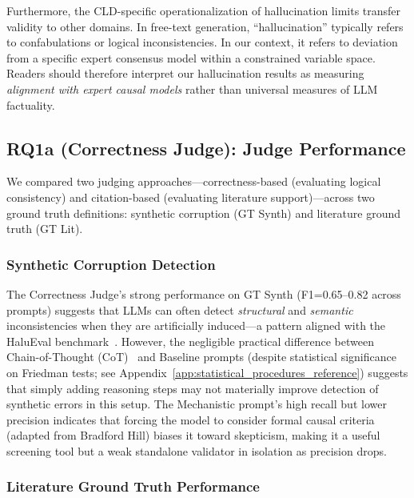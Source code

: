 Furthermore, the CLD-specific operationalization of hallucination limits transfer validity to other domains. In free-text generation, ``hallucination'' typically refers to confabulations or logical inconsistencies. In our context, it refers to deviation from a specific expert consensus model within a constrained variable space. Readers should therefore interpret our hallucination results as measuring \textit{alignment with expert causal models} rather than universal measures of LLM factuality.

\subsection{RQ1a (Correctness Judge): Judge Performance}
\label{sec:discussion_rq1a_correctness}

We compared two judging approaches---correctness-based (evaluating logical consistency) and citation-based (evaluating literature support)---across two ground truth definitions: synthetic corruption (GT Synth) and literature ground truth (GT Lit).

\subsubsection{Synthetic Corruption Detection}

The Correctness Judge's strong performance on GT Synth (F1=0.65--0.82 across prompts) suggests that LLMs can often detect \textit{structural} and \textit{semantic} inconsistencies when they are artificially induced---a pattern aligned with the HaluEval benchmark~\citep{li2023halueval}. However, the negligible practical difference between Chain-of-Thought (CoT)~\citep{kojima2022large} and Baseline prompts (despite statistical significance on Friedman tests; see Appendix~\ref{app:statistical_procedures_reference}) suggests that simply adding reasoning steps may not materially improve detection of synthetic errors in this setup. The Mechanistic prompt's high recall but lower precision indicates that forcing the model to consider formal causal criteria (adapted from Bradford Hill) biases it toward skepticism, making it a useful screening tool but a weak standalone validator in isolation as precision drops.

\subsubsection{Literature Ground Truth Performance}

